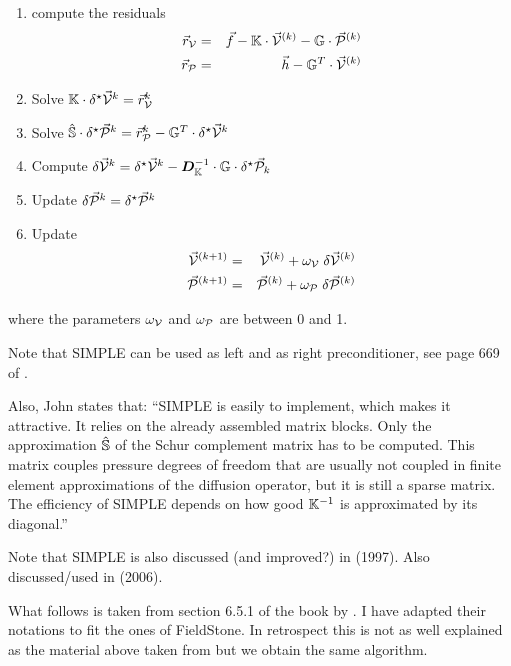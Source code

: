 \begin{mdframed}[backgroundcolor=blue!5]
\begin{enumerate}
\item compute the residuals 
\begin{eqnarray}
\vec{r}_{\cal V} &=& \vec{f} - {\mathbb{K}} \cdot \vec{\cal V}^{(k)} - {\mathbb{G}} \cdot \vec{\cal P}^{(k)} \nonumber\\
\vec{r}_{\cal P} &=& \vec{h} - {\mathbb{G}}^T \cdot \vec{\cal V}^{(k)}
\end{eqnarray}
\item Solve ${\mathbb{K}}  \cdot \delta^\star \vec{\cal V}^k =  \vec{r}_{\cal V}^k  $
\item Solve $\hat{{\mathbb{S}}} \cdot \delta^\star \vec{\cal P}^k =  \vec{r}_{\cal P}^k - {\mathbb{G}}^T \cdot  \delta^\star \vec{\cal V}^k $
\item Compute $\delta \vec{\cal V}^k = \delta^\star \vec{\cal V}^k -{\bm D}_{\mathbb{K}}^{-1} \cdot {\mathbb{G}} \cdot \delta^\star \vec{\cal P}_k $
\item Update $\delta \vec{\cal P}^k = \delta^\star \vec{\cal P}^k$
\item Update 
\begin{eqnarray}
\vec{\cal V}^{(k+1)} &=& \vec{\cal V}^{(k)} + \omega_{\cal V} \; \delta \vec{\cal V}^{(k)} \nonumber\\
\vec{\cal P}^{(k+1)} &=& \vec{\cal P}^{(k)} + \omega_{\cal P} \; \delta \vec{\cal P}^{(k)} 
\end{eqnarray}
\end{enumerate}
\end{mdframed}
where the parameters $\omega_{\cal V}$ and $\omega_{\cal P}$ are between 0 and 1. 

Note that SIMPLE can be used as left and as right preconditioner, 
see page 669 of \textcite{john16}.

Also, John states that:
``SIMPLE is easily to implement, which makes
it attractive. It relies on the already assembled matrix blocks. Only the approximation 
$\hat{{\mathbb{S}}}$ of the Schur complement matrix has to be computed. This
matrix couples pressure degrees of freedom that are usually not coupled in finite
element approximations of the diffusion operator, but it is still a sparse matrix.
The efficiency of SIMPLE depends on how good ${\mathbb{K}}^{-1}$ is approximated by its
diagonal.''


Note that SIMPLE is also discussed (and improved?) in \cite{brsa97b} (1997). 
Also discussed/used in \textcite{elhs06} (2006).


\newpage
What follows is taken from section 6.5.1 of the book by \cite{tack10}.
I have adapted their notations to fit the ones of FieldStone. 
In retrospect this is not as well explained as the material above 
taken from \textcite{john16} but we obtain the same algorithm. 

